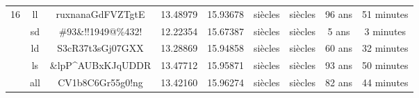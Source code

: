 \begin{table}[H]
{\begin{tabular}{lcccccccc}
			\multirow{5}{*}{16}                               & ll                           & ruxnanaGdFVZTgtE                                 & 13.48979                                                                            & 15.93678                                                                                        & siècles                                                            & siècles                                                              & 96 ans                                                               & 51 minutes                                                           \\ \cline{2-9} 
			& sd                           & \#93\&!!1949@\%432!                              & 12.22354                                                                            & 15.67387                                                                                        & siècles                                                            & siècles                                                              & 5 ans                                                                & 3 minutes                                                            \\ \cline{2-9} 
			& ld                           & S3cR37t3sGj07GXX                                 & 13.28869                                                                            & 15.94858                                                                                        & siècles                                                            & siècles                                                              & 60 ans                                                               & 32 minutes                                                           \\ \cline{2-9} 
			& ls                           & \&lpP\textasciicircum{}AUBxKJqUDDR               & 13.47712                                                                            & 15.95871                                                                                        & siècles                                                            & siècles                                                              & 93 ans                                                               & 50 minutes                                                           \\ \cline{2-9} 
			& all                          & CV1b8C6Gr55g0!ng                                 & 13.42160                                                                            & 15.96274                                                                                        & siècles                                                            & siècles                                                              & 82 ans                                                               & 44 minutes                                                           \\ \hline\midrule

\end{tabular}}
\end{table}
